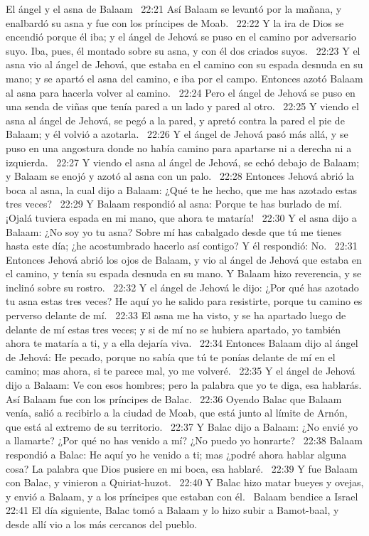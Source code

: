 El ángel y el asna de Balaam  
22:21 Así Balaam se levantó por la mañana, y enalbardó su asna y fue con los príncipes de Moab.  
22:22 Y la ira de Dios se encendió porque él iba; y el ángel de Jehová se puso en el camino por adversario suyo. Iba, pues, él montado sobre su asna, y con él dos criados suyos.  
22:23 Y el asna vio al ángel de Jehová, que estaba en el camino con su espada desnuda en su mano; y se apartó el asna del camino, e iba por el campo. Entonces azotó Balaam al asna para hacerla volver al camino.  
22:24 Pero el ángel de Jehová se puso en una senda de viñas que tenía pared a un lado y pared al otro.  
22:25 Y viendo el asna al ángel de Jehová, se pegó a la pared, y apretó contra la pared el pie de Balaam; y él volvió a azotarla.  
22:26 Y el ángel de Jehová pasó más allá, y se puso en una angostura donde no había camino para apartarse ni a derecha ni a izquierda.  
22:27 Y viendo el asna al ángel de Jehová, se echó debajo de Balaam; y Balaam se enojó y azotó al asna con un palo.  
22:28 Entonces Jehová abrió la boca al asna, la cual dijo a Balaam: ¿Qué te he hecho, que me has azotado estas tres veces?  
22:29 Y Balaam respondió al asna: Porque te has burlado de mí. ¡Ojalá tuviera espada en mi mano, que ahora te mataría!  
22:30 Y el asna dijo a Balaam: ¿No soy yo tu asna? Sobre mí has cabalgado desde que tú me tienes hasta este día; ¿he acostumbrado hacerlo así contigo? Y él respondió: No.  
22:31 Entonces Jehová abrió los ojos de Balaam, y vio al ángel de Jehová que estaba en el camino, y tenía su espada desnuda en su mano. Y Balaam hizo reverencia, y se inclinó sobre su rostro.  
22:32 Y el ángel de Jehová le dijo: ¿Por qué has azotado tu asna estas tres veces? He aquí yo he salido para resistirte, porque tu camino es perverso delante de mí.  
22:33 El asna me ha visto, y se ha apartado luego de delante de mí estas tres veces; y si de mí no se hubiera apartado, yo también ahora te mataría a ti, y a ella dejaría viva.  
22:34 Entonces Balaam dijo al ángel de Jehová: He pecado, porque no sabía que tú te ponías delante de mí en el camino; mas ahora, si te parece mal, yo me volveré.  
22:35 Y el ángel de Jehová dijo a Balaam: Ve con esos hombres; pero la palabra que yo te diga, esa hablarás. Así Balaam fue con los príncipes de Balac.  
22:36 Oyendo Balac que Balaam venía, salió a recibirlo a la ciudad de Moab, que está junto al límite de Arnón, que está al extremo de su territorio.  
22:37 Y Balac dijo a Balaam: ¿No envié yo a llamarte? ¿Por qué no has venido a mí? ¿No puedo yo honrarte?  
22:38 Balaam respondió a Balac: He aquí yo he venido a ti; mas ¿podré ahora hablar alguna cosa? La palabra que Dios pusiere en mi boca, esa hablaré.  
22:39 Y fue Balaam con Balac, y vinieron a Quiriat-huzot.  
22:40 Y Balac hizo matar bueyes y ovejas, y envió a Balaam, y a los príncipes que estaban con él.  
Balaam bendice a Israel  
22:41 El día siguiente, Balac tomó a Balaam y lo hizo subir a Bamot-baal, y desde allí vio a los más cercanos del pueblo.  
